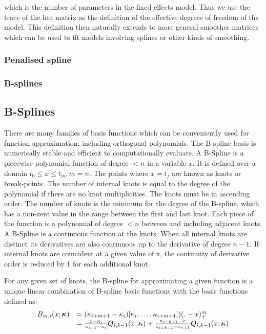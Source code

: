 \documentclass{amsart}[12pt]
\begin{document}
which is the number of parameters in the fixed effects model. Thus we use the trace of the hat matrix as
the definition of the effective degrees of freedom of the model. This definition then naturally extends to
more general smoother matrices which can be used to fit models involving splines or other kinds of smoothing.

\subsubsection{Penalised spline}
\subsubsection{B-splines}
\subsection{B-Splines}
There are many families of basis functions which can be conveniently used for function approximation,
including orthogonal polynomials.
The B-spline basis \citep{DeBoor1972} is numerically stable and efficient to computationally evaluate.
A B-Spline is a piecewise polynomial function of degree $< n$ in a variable $x$.
It is defined over a
domain $t_0 \leq x \leq t_m, m=n$. The points where $x = t_j$ are known as knots or break-points. The
number of internal knots is equal to the degree of the polynomial if there are no knot multiplicities.
The knots must be in ascending order. The number of knots is the minimum for the degree of the B-spline,
which has a non-zero value in the range between the first and last knot. Each piece of the function is a
polynomial of degree $< n$ between and including adjacent knots. A B-Spline is a continuous function at the
knots. When all internal knots are distinct its derivatives are also continuous up to the derivative of degree
$n - 1$. If internal knots are coincident at a given value of x, the continuity of derivative order is reduced
by 1 for each additional knot.

For any given set of knots, the B-spline for approximating a given function is a unique linear combination
of B-spline basis functions with the basis functions defined as:
$$
\begin{array}{rl}
	B_{m, i}(x; {\boldsymbol \kappa}) &= (\kappa_{i + m  + 1} - \kappa_{i})[\kappa_i, \ldots, \kappa_{i + m + 1}])(. - x)^m_+ \\
	&= \frac{x - \kappa_i}{\kappa_{i + 1} - \kappa_i} Q_{i, k-1} (x; {\boldsymbol \kappa}) + 
										\frac{\kappa_{i + k + 1} - x}{\kappa_{i + k + 1} - \kappa_{i + 1}} Q_{i, k-1} (x; {\boldsymbol \kappa})
\end{array}
$$
\end{document}
